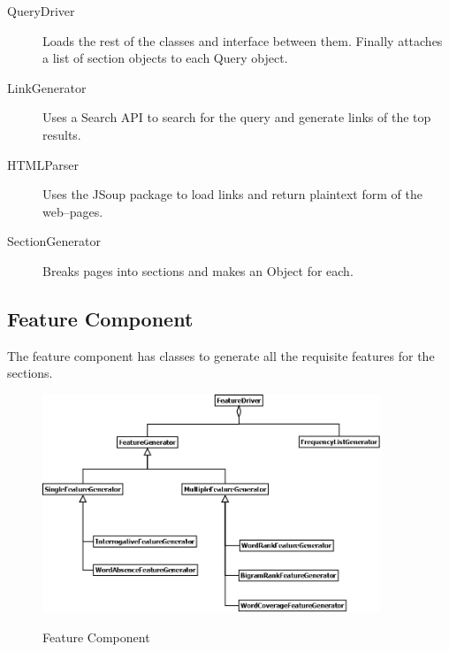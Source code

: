 \documentclass[10pt,a4paper]{report}
\begin{document}
\begin{description}
	\item[QueryDriver] Loads the rest of the classes and interface between them. Finally attaches a list of section objects to each Query object.
	\item[LinkGenerator] Uses a Search API to search for the query and generate links of the top results.
	\item[HTMLParser] Uses the JSoup package to load links and return plaintext form of the web--pages.
	\item[SectionGenerator] Breaks pages into sections and makes an Object for each.
\end{description}

\clearpage


\subsection{Feature Component}

The feature component has classes to generate all the requisite features for the sections. \\

\begin{figure}[h!]
\centering
\includegraphics[width=0.90\textwidth]{./diagrams/Feature}\\
\caption{Feature Component}
\end{figure}
\end{document}
